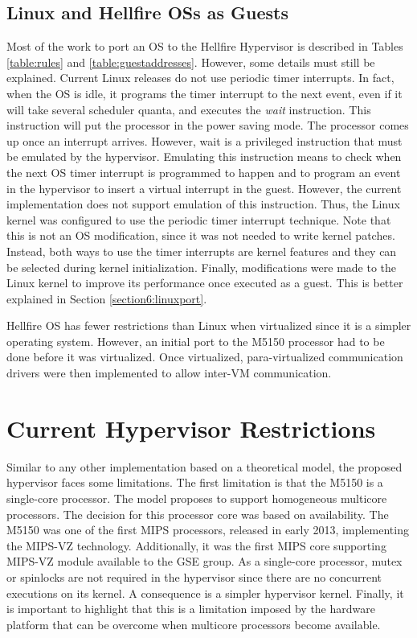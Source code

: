 \subsection{Linux and Hellfire OSs as Guests}

Most of the work to port an OS to the Hellfire Hypervisor is described in Tables \ref{table:rules} and \ref{table:guestaddresses}. However, some details must still be explained. Current Linux releases do not use periodic timer interrupts. In fact, when the OS is idle, it programs the timer interrupt to the next event, even if it will take several scheduler quanta, and executes the \textit{wait} instruction. This instruction will put the processor in the power saving mode. The processor comes up once an interrupt arrives. However, wait is a privileged instruction that must be emulated by the hypervisor. Emulating this instruction means to check when the next OS timer interrupt is programmed to happen and to program an event in the hypervisor to insert a virtual interrupt in the guest. However, the current implementation does not support emulation of this instruction. Thus, the Linux kernel was configured to use the periodic timer interrupt technique. Note that this is not an OS modification, since it was not needed to write kernel patches. Instead, both ways to use the timer interrupts are kernel features and they can be selected during kernel initialization. Finally, modifications were made to the Linux kernel to improve its performance once executed as a guest. This is better explained in Section \ref{section6:linuxport}.

Hellfire OS has fewer restrictions than Linux when virtualized since it is a simpler operating system. However, an initial port to the M5150 processor had to be done before it was virtualized. Once virtualized, para-virtualized communication drivers were then implemented to allow inter-VM communication. 


\section{Current Hypervisor Restrictions}

Similar to any other implementation based on a theoretical model, the proposed hypervisor faces some limitations. The first limitation is that the M5150 is a single-core processor. The model proposes to support homogeneous multicore processors. The decision for this processor core was based on availability. The M5150 was one of the first MIPS processors, released in early 2013, implementing the MIPS-VZ technology. Additionally, it was the first MIPS core supporting MIPS-VZ module available to the GSE group. As a single-core processor, mutex or spinlocks are not required in the hypervisor since there are no concurrent executions on its kernel. A consequence is a simpler hypervisor kernel. Finally, it is important to highlight that this is a limitation imposed by the hardware platform that can be overcome when multicore processors become available.

